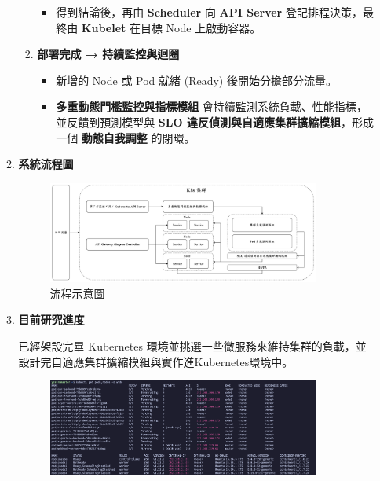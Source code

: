 \documentclass[12pt,a4paper]{article}
\begin{document}
\begin{enumerate}[label={(\zhdig*)}, leftmargin=2\parindent, listparindent=\parindent]
\begin{enumerate}[label={(\arabic*)}, leftmargin=\parindent, listparindent=\parindent]
\begin{enumerate}[label={(\zhdig*)}, leftmargin=\parindent, listparindent=\parindent]
\begin{itemize}[leftmargin=\parindent, listparindent=\parindent]
        \item 得到結論後，再由 \textbf{Scheduler} 向 \textbf{API Server} 登記排程決策，最終由 \textbf{Kubelet} 在目標 Node 上啟動容器。
    \end{itemize}
\item \textbf{部署完成 → 持續監控與迴圈}\textbf{}
    \begin{itemize}[leftmargin=\parindent, listparindent=\parindent]

        \item 新增的 Node 或 Pod 就緒 (Ready) 後開始分擔部分流量。

        \item \textbf{多重動態門檻監控與指標模組} 會持續監測系統負載、性能指標，並反饋到預測模型與 \textbf{SLO 違反偵測與自適應集群擴縮模組}，形成一個 \textbf{動態自我調整} 的閉環。
\end{itemize}
    \end{enumerate}

\item \textbf{
    系統流程圖}
\begin{figure} [htbp]

    \centering

\includegraphics[width=0.9\textwidth]{../figure/flowchart.png}

    \caption{流程示意圖}

\end{figure}

\item \textbf{
    目前研究進度}

    已經架設完畢 Kubernetes 環境並挑選一些微服務來維持集群的負載，並設計完自適應集群擴縮模組與實作進Kubernetes環境中。

\begin{figure} [htbp]

    \centering

    \includegraphics[width=0.9\textwidth]{../figure/k8s.png}


\end{figure}
\end{enumerate}
\end{enumerate}
\end{document}
